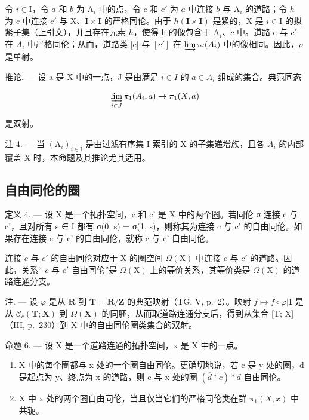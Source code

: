令 \(i \in \mathrm{I}\)，令 \(a\) 和 \(b\) 为 \(\mathrm{A}_i\) 中的点，令 \(c\) 和 \(c'\) 为 \(a\) 中连接 \(b\) 与 \(\mathrm{A}_i\) 的道路；令 \(h\) 为 \(c\) 中连接 \(c'\) 与 \(\mathrm{X}\)、\(\mathbf{I} \times \mathbf{I}\) 的严格同伦。由于 \(h(\mathbf{I} \times \mathbf{I})\) 是紧的，\(\mathrm{X}\) 是 \(i \in \mathrm{I}\) 的拟紧子集（上引文），并且存在元素 \(h\)，使得 h 的像包含于 \(\mathrm{A}_i\)、\(c\) 中。道路 c 与 \(c'\) 在 \(A_{i}\) 中严格同伦；从而，道路类 {[}c{]} 与 \([c']\) 在 \(\varinjlim\varpi(A_{i})\) 中的像相同。因此，\(\rho\) 是单射。

推论. --- 设 a 是 X 中的一点，J 是由满足 \(i \in I\) 的 \(a \in A_{i}\) 组成的集合。典范同态

\[
\varinjlim_ {i \in J} \pi_ {1} (A _ {i}, a) \to \pi_ {1} (X, a)
\]

是双射。

注 4. --- 当 \((\mathrm{A}_{i})_{i\in\mathrm{I}}\) 是由过滤有序集 I 索引的 X 的子集递增族，且各 \(A_{i}\) 的内部覆盖 X 时，本命题及其推论尤其适用。

\subsection{自由同伦的圈}

定义 4. --- 设 X 是一个拓扑空间，c 和 c' 是 X 中的两个圈。若同伦 σ 连接 c 与 c'，且对所有 s ∈ I 都有 σ(0, s) = σ(1, s)，则称其为连接 c 与 c' 的自由同伦。如果存在连接 c 与 c' 的自由同伦，就称 c 与 c' 自由同伦。

连接 \(c\) 与 \(c'\) 的自由同伦对应于 X 的圈空间 \(\Omega(\mathrm{X})\) 中连接 \(c\) 与 \(c'\) 的道路。因此，关系“ \(c\) 与 \(c'\) 自由同伦”是 \(\Omega(\mathrm{X})\) 上的等价关系，其等价类是 \(\Omega(\mathrm{X})\) 的道路连通分支。

注. --- 设 \(\varphi\) 是从 \(\mathbf{R}\) 到 \(\mathbf{T} = \mathbf{R}/\mathbf{Z}\) 的典范映射（TG, V, p.~2）。映射 \(f \mapsto f \circ \varphi|\mathbf{I}\) 是从 \(\mathcal{C}_c(\mathbf{T};\mathbf{X})\) 到 \(\Omega(\mathbf{X})\) 的同胚，从而取道路连通分支后，得到从集合 {[}T; X{]}（III, p.~230）到 X 中的自由同伦圈类集合的双射。

命题 6. --- 设 X 是一个道路连通的拓扑空间，x 是 X 中的一点。

\begin{enumerate}
\def\labelenumi{\alph{enumi})}
\item
  X 中的每个圈都与 x 处的一个圈自由同伦。更确切地说，若 c 是 y 处的圈，d 是起点为 y、终点为 x 的道路，则 c 与 x 处的圈 \((\overline{d} * c) * d\) 自由同伦。
\item
  X 中 x 处的两个圈自由同伦，当且仅当它们的严格同伦类在群 \(\pi_{1}(X,x)\) 中共轭。
\end{enumerate}

